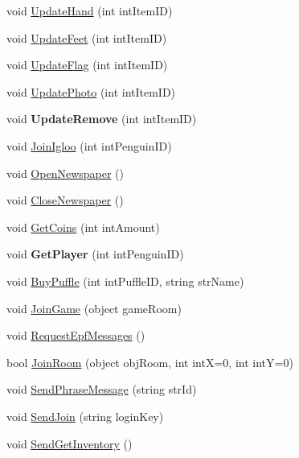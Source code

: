 \begin{DoxyCompactItemize}
void \hyperlink{classSharpenguin_1_1Tasks_a8850c8610c0788f7890afe63a44c681c}{Update\-Hand} (int int\-Item\-I\-D)
\item 
void \hyperlink{classSharpenguin_1_1Tasks_a6730cfdc8d72302db9b86b1d62e17af3}{Update\-Feet} (int int\-Item\-I\-D)
\item 
void \hyperlink{classSharpenguin_1_1Tasks_a5112e2d46cbc1bc1098d555d712ddb6b}{Update\-Flag} (int int\-Item\-I\-D)
\item 
void \hyperlink{classSharpenguin_1_1Tasks_a3fb87d11cff96706caa6e92b545a3491}{Update\-Photo} (int int\-Item\-I\-D)
\item 
\hypertarget{classSharpenguin_1_1Tasks_af6ff0aaa9b6a61005b0abeef5eac4432}{void {\bfseries Update\-Remove} (int int\-Item\-I\-D)}\label{classSharpenguin_1_1Tasks_af6ff0aaa9b6a61005b0abeef5eac4432}

\item 
void \hyperlink{classSharpenguin_1_1Tasks_ae96f02abc81b122ddf425fcec3f6b311}{Join\-Igloo} (int int\-Penguin\-I\-D)
\item 
void \hyperlink{classSharpenguin_1_1Tasks_ae0fe7cd8870c286b9c99501dfdcd6320}{Open\-Newspaper} ()
\item 
void \hyperlink{classSharpenguin_1_1Tasks_ad866855a8845c055b1848d91e74a20fe}{Close\-Newspaper} ()
\item 
void \hyperlink{classSharpenguin_1_1Tasks_af26fee91182657a4567ddbc04c5cf8aa}{Get\-Coins} (int int\-Amount)
\item 
\hypertarget{classSharpenguin_1_1Tasks_aea10b784b7cd500f73bb1c1daeec3a2d}{void {\bfseries Get\-Player} (int int\-Penguin\-I\-D)}\label{classSharpenguin_1_1Tasks_aea10b784b7cd500f73bb1c1daeec3a2d}

\item 
void \hyperlink{classSharpenguin_1_1Tasks_af729d70eb819036f9c9de6c10a7a672b}{Buy\-Puffle} (int int\-Puffle\-I\-D, string str\-Name)
\item 
void \hyperlink{classSharpenguin_1_1Tasks_afb52aff13d3e0f5e650bd15f69dcbdf5}{Join\-Game} (object game\-Room)
\item 
void \hyperlink{classSharpenguin_1_1Tasks_aa7b3d0007e785bdaebddd3df2575c7cd}{Request\-Epf\-Messages} ()
\item 
bool \hyperlink{classSharpenguin_1_1Tasks_ac58d964d710fb7bf74f0a1568484625b}{Join\-Room} (object obj\-Room, int int\-X=0, int int\-Y=0)
\item 
void \hyperlink{classSharpenguin_1_1Tasks_a9ceb3ef96c8a645127c4353afbcc4560}{Send\-Phrase\-Message} (string str\-Id)
\item 
void \hyperlink{classSharpenguin_1_1Tasks_a9eeed598aeb0fea60ebb7b0189226a7e}{Send\-Join} (string login\-Key)
\item 
void \hyperlink{classSharpenguin_1_1Tasks_a2fd5289a96dc2a8466554e89fed6de97}{Send\-Get\-Inventory} ()
\end{DoxyCompactItemize}
